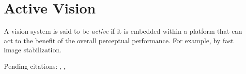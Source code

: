 \section{Active Vision}

A vision system is said to be {\em active} if it is embedded within a
platform that can act to the benefit of the overall perceptual
performance.  For example, by fast image stabilization.

Pending citations: \cite{tarr94computational},
\cite{tsikos91segmentation},
\cite{bajcsy88active}
\cite{aloimonos87active}
\cite{ballard91animate}
